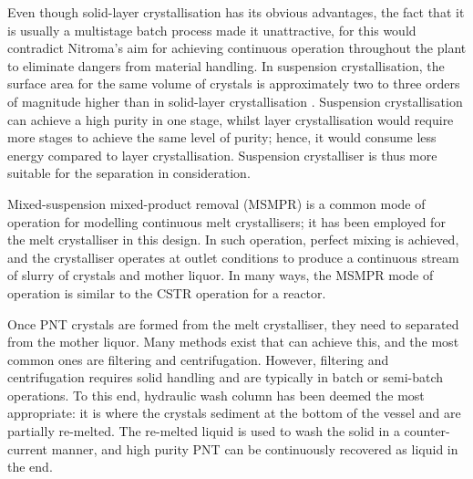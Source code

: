 Even though solid-layer crystallisation has its obvious advantages, the fact that it is usually a multistage batch process made it unattractive, for this would contradict Nitroma's aim for achieving continuous operation throughout the plant to eliminate dangers from material handling. In suspension crystallisation, the surface area for the same volume of crystals is approximately two to three orders of magnitude higher than in solid-layer crystallisation \cite{noauthor_types_nodate}. Suspension crystallisation can achieve a high purity in one stage, whilst layer crystallisation would require more stages to achieve the same level of purity; hence, it would consume less energy compared to layer crystallisation. Suspension crystalliser is thus more suitable for the separation in consideration. 

Mixed-suspension mixed-product removal (MSMPR) is a common mode of operation for modelling continuous melt crystallisers; it has been employed for the melt crystalliser in this design. In such operation, perfect mixing is achieved, and the crystalliser operates at outlet conditions to produce a continuous stream of slurry of crystals and mother liquor. In many ways, the MSMPR mode of operation is similar to the CSTR operation for a reactor. 


Once PNT crystals are formed from the melt crystalliser, they need to separated from the mother liquor. Many methods exist that can achieve this, and the most common ones are filtering and centrifugation. However, filtering and centrifugation requires solid handling and are typically in batch or semi-batch operations. To this end, hydraulic wash column has been deemed the most appropriate: it is where the crystals sediment at the bottom of the vessel and are partially re-melted. The re-melted liquid is used to wash the solid in a counter-current manner, and high purity PNT can be continuously recovered as liquid in the end. 
